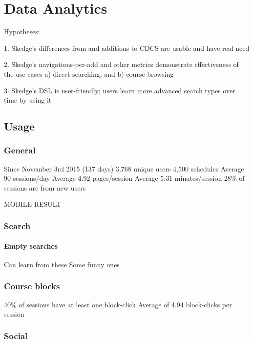 
\chapter{Data Analytics}

Hypotheses:

1. Skedge's differences from and additions to CDCS are usable and have real need

2. Skedge’s navigations-per-add and other metrics demonstrate effectiveness of the use cases
a) direct searching, and
b) course browsing

3. Skedge’s DSL is user-friendly; users learn more advanced search types over time by using it

\section{Usage}

\subsection{General}

Since November 3rd 2015 (137 days)
3,768 unique users
4,500 schedules
Average 90 sessions/day
Average 4.92 pages/session
Average 5:31 minutes/session
28\% of sessions are from new users

MOBILE RESULT

\subsection{Search}


  \subsubsection{Empty searches}

  Can learn from these
  Some funny ones

\subsection{Course blocks}

40\% of sessions have at least one block-click
Average of 4.94 block-clicks per session

\subsection{Social}

